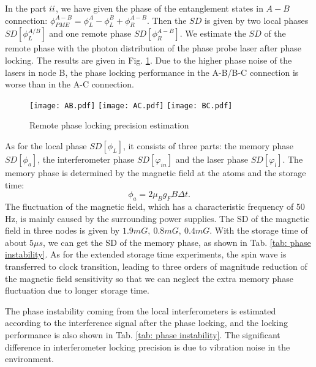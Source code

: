 \documentclass[aps,reprint,showpacs,superscriptaddress]{revtex4-2}
\begin{document}
In the part $\uppercase\expandafter{\romannumeral2}$, we have given the phase of the entanglement states in $A-B$ connection: $\phi_{PME}^{A-B}=\phi_L^A-\phi_L^B+\phi_R^{A-B}$. Then the $SD$ is given by two local phases $SD[\phi_L^{A/B}]$ and one remote phase $SD[\phi_R^{A-B}]$. We estimate the $SD$ of the remote phase with the photon distribution of the phase probe laser after phase locking. The results  are given in Fig. \ref{fig: remote phase locking}. Due to the higher phase noise of the lasers in node B, the phase locking performance in the A-B/B-C connection is worse than in the A-C connection.
\begin{figure}[htbp]
	\centering
	\label{fig: remote phase locking}
	\texttt{[image: AB.pdf]}
	\texttt{[image: AC.pdf]}
	\texttt{[image: BC.pdf]}
	\caption{Remote phase locking precision estimation}
  \end{figure}
  
As for the local phase $SD[\phi_L]$, it consists of three parts: the memory phase $SD[\phi_a]$, the interferometer phase $SD[\varphi_{in}]$ and the laser phase $SD[\varphi_l]$. The memory phase is determined by the magnetic field at the atoms and the storage time:
\begin{equation}
	\phi_a=2\mu_Bg_FB\Delta t.
\end{equation}
The fluctuation of the magnetic field, which has a characteristic  frequency of 50 Hz, is mainly caused by the surrounding power supplies. The SD of the magnetic field in three nodes is given by $1.9mG,\ 0.8mG,\ 0.4mG$.
With the storage time of about $5\mu s$, we can get the SD of the memory phase, as shown in Tab. \ref{tab: phase instability}. As for the extended storage time experiments, the spin wave is transferred to clock transition, leading to three orders of magnitude reduction of the magnetic field sensitivity so that we can neglect the extra memory phase fluctuation due to longer storage time.

The phase instability coming from the local interferometers is estimated according to the interference signal after the phase locking, and the locking performance is also shown in Tab. \ref{tab: phase instability}. The significant difference in interferometer locking precision is due to  vibration noise in the environment.
\end{document}
